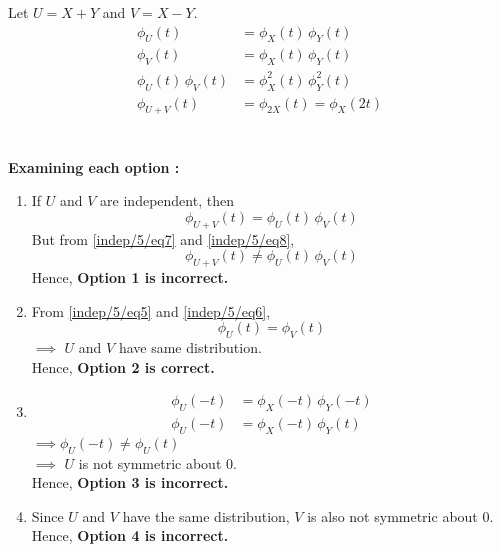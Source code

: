     Let $U=X+Y$ and $V=X-Y$.
    \begin{align}
        \phi_U(t) &= \phi_X(t)\, \phi_Y(t) \label{indep/5/eq5}\\
        \phi_V(t) &= \phi_X(t)\, \phi_Y(t) \label{indep/5/eq6}\\
        \phi_U(t) \, \phi_V(t) &= \phi_X^2(t) \, \phi_Y^2(t) \label{indep/5/eq7}\\
        \phi_{U+V}(t) &= \phi_{2X}(t) = \phi_{X}(2t) \label{indep/5/eq8}
    \end{align}
    \\\\
    \textbf{Examining each option :} 
    \begin{enumerate}
        \item 
        If $U$ and $V$ are independent, then \[\phi_{U+V}(t) = \phi_U(t)\, \phi_V(t)\]
        But from \eqref{indep/5/eq7} and \eqref{indep/5/eq8}, 
        \begin{equation}
            \phi_{U+V}(t) \neq \phi_U(t)\, \phi_V(t)
        \end{equation}
        Hence, \textbf{Option 1 is incorrect.}\\
        
        \item 
        From \eqref{indep/5/eq5} and \eqref{indep/5/eq6}, \[\phi_U(t) = \phi_V(t)\]
        $\implies$ $U$ and $V$ have same distribution.\\
        Hence, \textbf{Option 2 is correct.}\\
        
        \item 
        \begin{align}
            \phi_U(-t) &= \phi_X(-t)\, \phi_Y(-t) \\
            \phi_U(-t) &= \phi_X(-t)\, \phi_Y(t) 
        \end{align}
        \(\implies \phi_U(-t) \neq \phi_U(t)\) \\
        $\implies$ $U$ is not symmetric about $0$.\\
        Hence, \textbf{Option 3 is incorrect.}\\
        
        \item 
        Since $U$ and $V$ have the same distribution, $V$ is also not symmetric about $0$.\\
        Hence, \textbf{Option 4 is incorrect.}
    \end{enumerate}